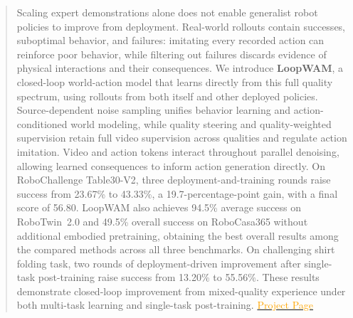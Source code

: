 \newcommand{\cmark}{\ding{51}}
\newcommand{\xmark}{\ding{55}}
\newcommand{\resultrow}[1]{\rlap{\hspace{-\tabcolsep}\color{#1} \rule[-\dp\@arstrutbox]{\resulttablewidth}{\dimexpr\ht\@arstrutbox+\dp\@arstrutbox\relax}}}
\newcommand{\resulthead}[1]{\begin{tabular}[c]{@{}c@{}}#1\end{tabular}}
\maketitle
\raggedbottom
{}
\setlength{\emergencystretch}{3em}

\begin{abstract}

Scaling expert demonstrations alone does not enable generalist robot policies to improve from deployment.
Real-world rollouts contain successes, suboptimal behavior, and failures: imitating every recorded action can reinforce poor behavior, while filtering out failures discards evidence of physical interactions and their consequences.
We introduce \textbf{LoopWAM}, a closed-loop world-action model that learns directly from this full quality spectrum, using rollouts from both itself and other deployed policies.
Source-dependent noise sampling unifies behavior learning and action-conditioned world modeling, while quality steering and quality-weighted supervision retain full video supervision across qualities and regulate action imitation.
Video and action tokens interact throughout parallel denoising, allowing learned consequences to inform action generation directly.
On RoboChallenge Table30-V2, three deployment-and-training rounds raise success from 23.67\% to 43.33\%, a 19.7-percentage-point gain, with a final score of 56.80.
LoopWAM also achieves 94.5\% average success on RoboTwin~2.0 and 49.5\% overall success on RoboCasa365 without additional embodied pretraining, obtaining the best overall results among the compared methods across all three benchmarks.
On challenging shirt folding task, two rounds of deployment-driven improvement after single-task post-training raise success from 13.20\% to 55.56\%.
These results demonstrate closed-loop improvement from mixed-quality experience under both multi-task learning and single-task post-training. 
\href{https://loop-wam.github.io/}{\textcolor{orange}{Project Page}}
\end{abstract}
\abscontent

